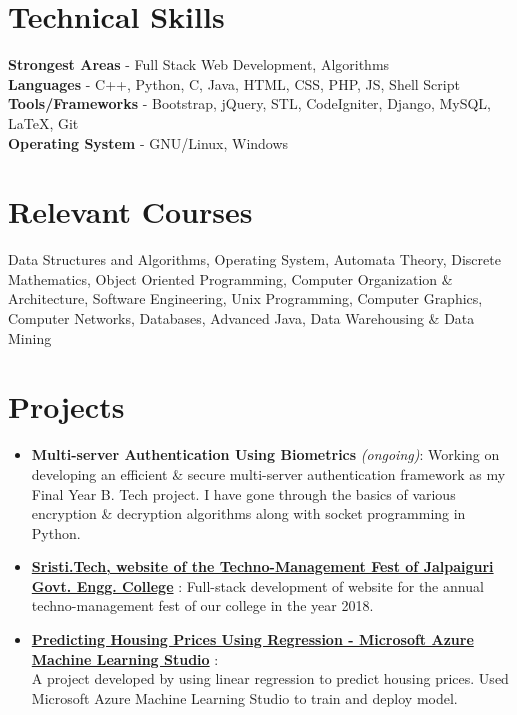 \documentclass[margin, centered]{res}
\begin{document}
\begin{resume}
\section{Technical \hspace{2mm} Skills}
\textbf{Strongest Areas} - Full Stack Web Development, Algorithms\\
\textbf{Languages} - C++, Python, C, Java, HTML, CSS, PHP, JS, Shell Script\\
\textbf{Tools/Frameworks} - Bootstrap, jQuery, STL, CodeIgniter, Django, MySQL, \LaTeX, Git\\
\textbf{Operating System} - GNU/Linux, Windows

\section{Relevant \hspace{2mm} Courses}
Data Structures and Algorithms, Operating System, Automata Theory, Discrete Mathematics, Object Oriented Programming, Computer Organization \& Architecture, Software Engineering, Unix Programming, Computer Graphics, Computer Networks, Databases, Advanced Java, Data Warehousing \& Data Mining \hfill

\section{Projects}
\begin{itemize}[leftmargin=*]
\item
\textbf{Multi-server Authentication Using Biometrics} \textit{(ongoing)}: Working on developing an efficient \& secure multi-server authentication framework as my Final Year B. Tech project. I have gone through the basics of various encryption \& decryption algorithms along with socket programming in Python.
\item
\textbf{\href{http://sristi.tech}{Sristi.Tech, website of the Techno-Management Fest of Jalpaiguri Govt. Engg. College}} : Full-stack development of website for the annual techno-management fest of our college in the year 2018.
 \item \textbf{\href{https://gallery.cortanaintelligence.com/Experiment/Prediction-of-Housing-Prices-1}{Predicting Housing Prices Using Regression - Microsoft Azure Machine Learning Studio}} :\\
 A project developed by using linear regression to predict housing prices. Used Microsoft Azure Machine Learning Studio to train and deploy model.
 

\end{itemize}
\end{resume}
\end{document}
